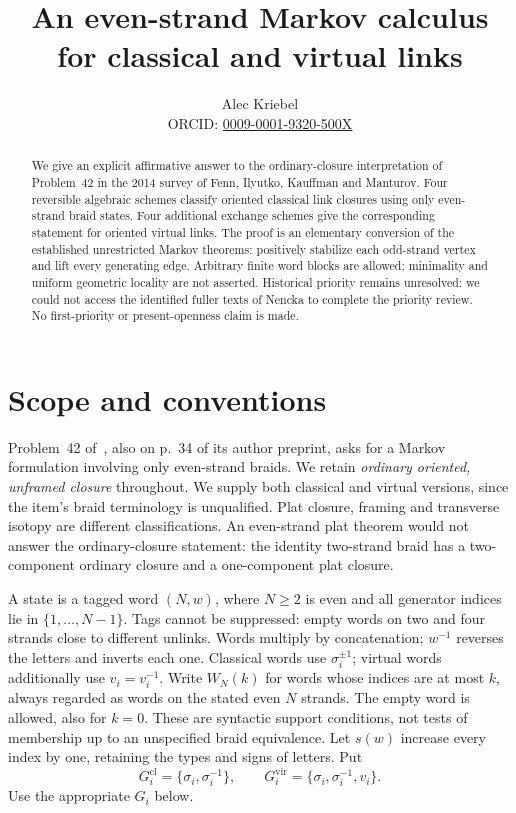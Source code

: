 \documentclass[11pt]{article}
\title{An even-strand Markov calculus for classical and virtual links}
\author{Alec Kriebel\\\small ORCID: \href{https://orcid.org/0009-0001-9320-500X}{0009-0001-9320-500X}}
\date{}
\newcommand{\sig}{\sigma}
\newcommand{\WB}[2]{W_{#1}(#2)}
\begin{document}
\maketitle
\begin{abstract}
We give an explicit affirmative answer to the ordinary-closure interpretation of
Problem~42 in the 2014 survey of Fenn, Ilyutko, Kauffman and Manturov.
Four reversible algebraic schemes classify oriented classical link closures
using only even-strand braid states. Four additional exchange schemes give the
corresponding statement for oriented virtual links. The proof is an elementary
conversion of the established unrestricted Markov theorems: positively stabilize
each odd-strand vertex and lift every generating edge. Arbitrary finite word
blocks are allowed; minimality and uniform geometric locality are not asserted.
Historical priority remains unresolved: we could not access the identified
fuller texts of Nencka to complete the priority review. No first-priority or
present-openness claim is made.
\end{abstract}

\section{Scope and conventions}
Problem~42 of~\cite[p.~37]{FIKM}, also on p.~34 of its author preprint,
asks for a Markov formulation involving only even-strand braids.
We retain \emph{ordinary oriented, unframed closure} throughout. We supply both
classical and virtual versions, since the item's braid terminology is unqualified.
Plat closure, framing and transverse isotopy are different classifications.
An even-strand plat theorem would not answer the ordinary-closure statement:
the identity two-strand braid has a two-component ordinary closure and a
one-component plat closure.

A state is a tagged word $(N,w)$, where $N\ge2$ is even and all generator
indices lie in $\{1,\ldots,N-1\}$. Tags cannot be suppressed: empty words on
two and four strands close to different unlinks. Words multiply by concatenation;
$w^{-1}$ reverses the letters and inverts each one. Classical words use
$\sig_i^{\pm1}$; virtual words additionally use $v_i=v_i^{-1}$.
Write $\WB{N}{k}$ for words whose indices are at most $k$, always regarded as
words on the stated even $N$ strands. The empty word is allowed, also for $k=0$.
These are syntactic support conditions, not tests of membership up to an
unspecified braid equivalence. Let $s(w)$ increase every index by one, retaining
the types and signs of letters. Put
\[
 G_i^{\mathrm{cl}}=\{\sig_i,\sig_i^{-1}\},\qquad
 G_i^{\mathrm{vir}}=\{\sig_i,\sig_i^{-1},v_i\}.
\]
Use the appropriate $G_i$ below.
\end{document}
